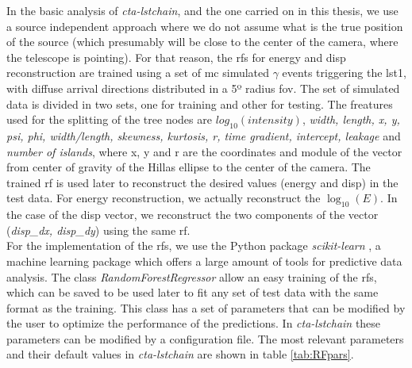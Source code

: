 \documentclass[main.tex]{subfiles}
\begin{document}
In the basic analysis of \textit{cta-lstchain}, and the one carried on in this thesis, we use a source independent approach where we do not assume  what is the true position of the source (which presumably will be close to the center of the camera, where the telescope is pointing). For that reason, the \glspl{rf} for energy and disp reconstruction are trained using a set of \gls{mc} simulated $\gamma$ events triggering the \gls{lst}1, with diffuse arrival directions distributed in a 5º radius \gls{fov}. The set of simulated data is divided in two sets, one for training and other for testing. The freatures used for the splitting of the tree nodes are $log_{10}(intensity)$, \textit{width, length, x, y, psi, phi, width/length, skewness, kurtosis, r, time gradient, intercept, leakage} and \textit{number of islands}, where x, y and r are the coordinates and module of the vector from center of gravity of the Hillas ellipse to the center of the camera. The trained \gls{rf} is used later to reconstruct the desired values (energy and disp) in the test data.
For energy reconstruction, we actually reconstruct the $\log_{10}(E)$. In the case of the disp vector, we reconstruct the two components of the vector (\textit{disp\_dx, disp\_dy}) using the same \gls{rf}.\\
For the implementation of the \glspl{rf}, we use the Python package \textit{scikit-learn} \cite{2011scikit-learn}, a machine learning package which offers a large amount of tools for predictive data analysis. The class \textit{RandomForestRegressor} allow an easy training of the \glspl{rf}, which can be saved to be used later to fit any set of test data with the same format as the training. This class has a set of parameters that can be modified by the user to optimize the performance of the predictions. In \textit{cta-lstchain} these parameters can be modified by a configuration file. The most relevant parameters and their default values in \textit{cta-lstchain} are shown in table \ref{tab:RFpars}. 
\end{document}
